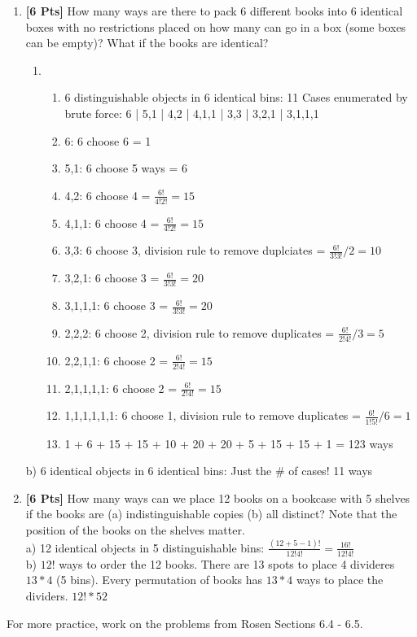 \documentclass[11pt]{article}
\begin{document}
\begin{enumerate}
        \item {\bf [6 Pts]} How many ways are there to pack 6 different books into 6 identical boxes with no restrictions placed on how many can go in a box (some boxes can be empty)? What if the books are identical? \\
        \begin{enumerate}
            \item
            \begin{enumerate}
                \item 6 distinguishable objects in 6 identical bins: 11 Cases enumerated by brute force: 6 | 5,1 | 4,2 | 4,1,1 | 3,3 | 3,2,1 | 3,1,1,1
                \item 6: 6 choose 6 = 1
                \item 5,1: 6 choose 5 ways = 6
                \item 4,2: 6 choose 4 = $\frac{6!}{4!2!} = 15$
                \item 4,1,1: 6 choose 4 = $\frac{6!}{4!2!} = 15$
                \item 3,3: 6 choose 3, division rule to remove duplciates = $\frac{6!}{3!3!}/2 = 10$
                \item 3,2,1: 6 choose 3 = $\frac{6!}{3!3!} = 20$
                \item 3,1,1,1: 6 choose 3 = $\frac{6!}{3!3!} = 20$
                \item 2,2,2: 6 choose 2, division rule to remove duplicates = $\frac{6!}{2!4!}/3 = 5$
                \item 2,2,1,1: 6 choose 2 = $\frac{6!}{2!4!} = 15$
                \item 2,1,1,1,1: 6 choose 2 = $\frac{6!}{2!4!} = 15$
                \item 1,1,1,1,1,1: 6 choose 1, division rule to remove duplicates = $\frac{6!}{1!5!}/6 = 1$
                \item 1 + 6 + 15 + 15 + 10 + 20 + 20 + 5 + 15 + 15 + 1 = 123 ways
            \end{enumerate}
        \end{enumerate}
        b) 6 identical objects in 6 identical bins: Just the \# of cases! 11 ways

        \item {\bf [6 Pts]} How many ways can we place 12 books on a bookcase with 5 shelves if the books are (a) indistinguishable copies (b) all distinct? Note that the position of the books on the shelves matter. \\
        a) 12 identical objects in 5 distinguishable bins: $\frac{(12 + 5 - 1)!}{12!4!} = \frac{16!}{12!4!}$ \\
        b) $12!$ ways to order the 12 books. There are 13 spots to place 4 divideres $13 * 4$ (5 bins). Every permutation of books has $13 * 4$ ways to place the dividers. $12! * 52$
    \end{enumerate}

    \noindent
    For more practice, work on the problems from Rosen Sections 6.4 - 6.5.
\end{document}
